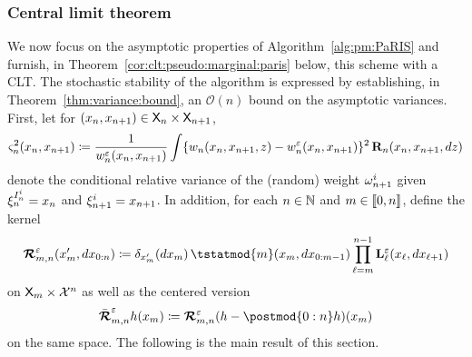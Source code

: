 
\subsubsection*{Central limit theorem}

We now focus on the asymptotic properties of Algorithm~\ref{alg:pm:PaRIS} and furnish, in Theorem~\ref{cor:clt:pseudo:marginal:paris} below, this scheme with a CLT. The stochastic stability of the algorithm is expressed by establishing, in Theorem~\ref{thm:variance:bound}, an $\mathcal{O}(n)$ bound on the asymptotic variances. %
First, let for $(x_n, x_{n + 1}) \in \mathsf{X}_n \times \mathsf{X}_{n + 1}$, 
\begin{multline} \label{eq:def:ukestvar}
\ukestvar{n}(x_n, x_{n + 1}) \eqdef 
\frac{1}{\wgtfuncmod{n}(x_n, x_{n + 1})} \int \{ \wgtfunc{n}(x_n, x_{n + 1}, z) - \wgtfuncmod{n}(x_n, x_{n + 1}) \}^2 \, \ukdist{n}(x_n, x_{n + 1}, \rmd z)
\end{multline}
denote the conditional relative variance of the (random) weight $\omega_{n + 1}^{i}$ given $\xi_{n}^{I_{n}^{i}} = x_n$ and $\xi_{n + 1}^{i}= x_{n + 1}$. In addition, for each $n \in \mathbb{N}$ and $m \in \llbracket 0, n \rrbracket$, define the kernel  
\begin{equation} \label{eq:def:retrokmodmod}
    \retrokmodmod_{m, n}(x_m', \rmd x_{0:n}) \eqdef \delta_{x_m'}(\rmd x_m) \,  
    \tstatmod{m}(x_m, \rmd x_{0:m - 1})
    \prod_{\ell = m}^{n - 1} \ukmod{\ell}(x_\ell, \rmd x_{\ell + 1})
\end{equation}
on $\mathsf{X}_m \times \mathcal{X}^n$ as well as the centered version 
\begin{equation} \label{eq:def:retrokmodmodnorm}
\retrokmodmodnorm_{m, n} h (x_m) \eqdef  \retrokmodmod_{m, n}(h - \postmod{0:n} h)(x_m) 
\end{equation}
on the same space. The following is the main result of this section. 

